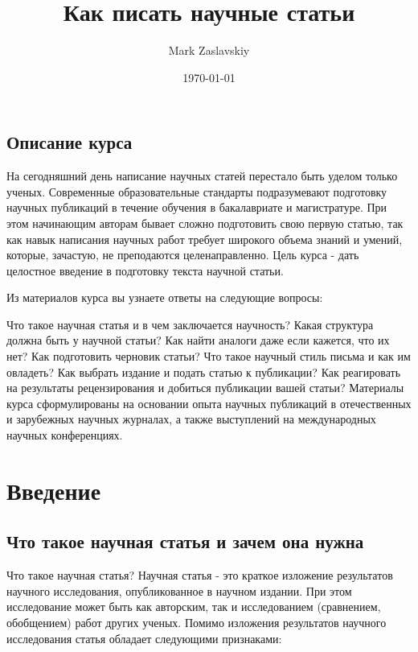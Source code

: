 \documentclass{report}
\begin{document}
\title{Как писать научные статьи}
\author{Mark Zaslavskiy}
\date{\today}
\maketitle
\tableofcontents
\newpage



\section*{Описание курса}

На сегодняшний день написание научных статей перестало быть уделом только ученых. Современные образовательные стандарты подразумевают подготовку научных публикаций в течение обучения в бакалавриате и магистратуре. При этом начинающим авторам бывает сложно подготовить свою первую статью, так как навык написания научных работ требует широкого объема знаний и умений, которые, зачастую, не преподаются целенаправленно. Цель курса - дать целостное введение в подготовку текста научной статьи.

Из материалов курса вы узнаете ответы на следующие вопросы:

Что такое научная статья и в чем заключается научность?
Какая структура должна быть у научной статьи?
Как найти аналоги даже если кажется, что их нет?
Как подготовить черновик статьи?
Что такое научный стиль письма и как им овладеть?
Как выбрать издание и подать статью к публикации?
Как реагировать на результаты рецензирования и добиться публикации вашей статьи?
Материалы курса сформулированы на основании опыта научных публикаций в отечественных и зарубежных научных журналах, а также выступлений на международных научных конференциях.

\chapter{Введение}

\section{Что такое научная статья и зачем она нужна}
Что такое научная статья?
Научная статья - это краткое изложение результатов научного исследования, опубликованное в научном издании. При этом исследование может быть как авторским, так и исследованием (сравнением, обобщением) работ других ученых.
Помимо изложения результатов научного исследования статья обладает следующими признаками:
\end{document}
